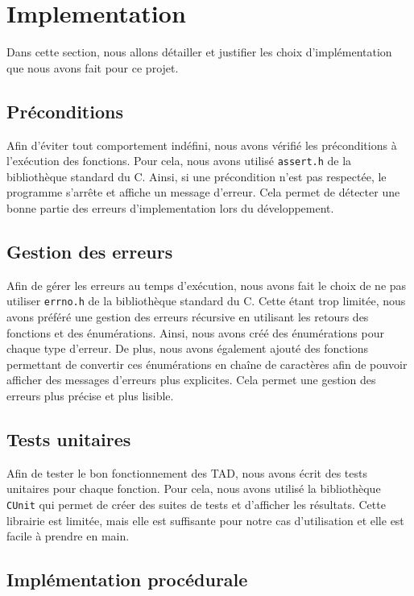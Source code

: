 \section{Implementation}

Dans cette section, nous allons détailler et justifier les choix d'implémentation que nous avons fait pour ce projet.

\subsection{Préconditions}

Afin d'éviter tout comportement indéfini, nous avons vérifié les préconditions à l'exécution des fonctions.
Pour cela, nous avons utilisé \texttt{assert.h} de la bibliothèque standard du C. 
Ainsi, si une précondition n'est pas respectée, le programme s'arrête et affiche un message d'erreur.
Cela permet de détecter une bonne partie des erreurs d'implementation lors du développement.

\subsection{Gestion des erreurs}

Afin de gérer les erreurs au temps d'exécution, nous avons fait le choix de ne pas utiliser \texttt{errno.h} de la bibliothèque standard du C.
Cette étant trop limitée, nous avons préféré une gestion des erreurs récursive en utilisant les retours des fonctions et des énumérations.
Ainsi, nous avons créé des énumérations pour chaque type d'erreur. De plus, nous avons également ajouté des fonctions permettant de convertir ces énumérations en chaîne de caractères afin de pouvoir afficher des messages d'erreurs plus explicites.
Cela permet une gestion des erreurs plus précise et plus lisible.

\subsection{Tests unitaires}

Afin de tester le bon fonctionnement des TAD, nous avons écrit des tests unitaires pour chaque fonction.
Pour cela, nous avons utilisé la bibliothèque \texttt{CUnit} qui permet de créer des suites de tests et d'afficher les résultats.
Cette librairie est limitée, mais elle est suffisante pour notre cas d'utilisation et elle est facile à prendre en main.

\subsection{Implémentation procédurale}

